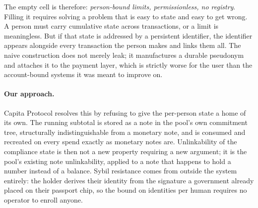 \documentclass[11pt,a4paper]{article}
\theoremstyle{definition}
\theoremstyle{plain}
\theoremstyle{remark}
\begin{document}
The empty cell is therefore: \emph{person-bound limits, permissionless, no registry}. Filling it requires solving a problem that is easy to state and easy to get wrong. A person must carry cumulative state across transactions, or a limit is meaningless. But if that state is addressed by a persistent identifier, the identifier appears alongside every transaction the person makes and links them all. The naive construction does not merely leak; it manufactures a durable pseudonym and attaches it to the payment layer, which is strictly worse for the user than the account-bound systems it was meant to improve on.

\paragraph{Our approach.}
Capita Protocol resolves this by refusing to give the per-person state a home of its own. The running subtotal is stored as a note in the pool's own commitment tree, structurally indistinguishable from a monetary note, and is consumed and recreated on every spend exactly as monetary notes are. Unlinkability of the compliance state is then not a new property requiring a new argument; it is the pool's existing note unlinkability, applied to a note that happens to hold a number instead of a balance. Sybil resistance comes from outside the system entirely: the holder derives their identity from the signature a government already placed on their passport chip, so the bound on identities per human requires no operator to enroll anyone.
\end{document}
